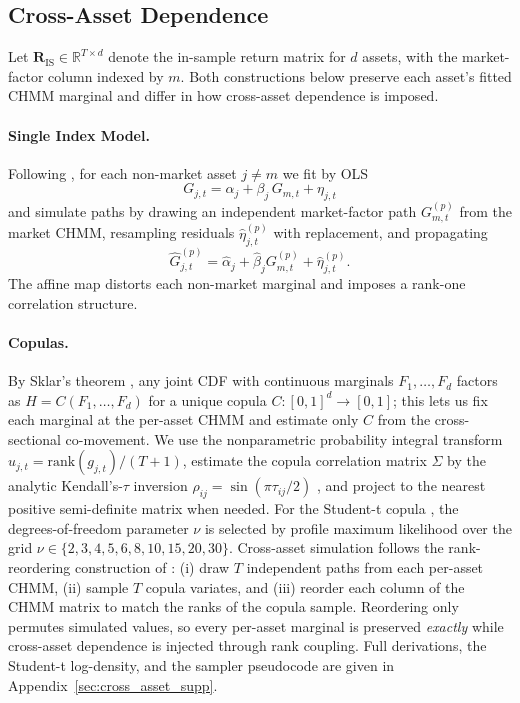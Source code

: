 \subsection{Cross-Asset Dependence}
\label{sec:cross_asset_methods}

Let $\mathbf{R}_{\text{IS}} \in \mathbb{R}^{T \times d}$ denote the in-sample return matrix for $d$ assets, with the market-factor column indexed by $m$.
Both constructions below preserve each asset's fitted CHMM marginal and differ in how cross-asset dependence is imposed.

\paragraph{Single Index Model.}
Following \citet{sharpe1963simplified}, for each non-market asset $j \neq m$ we fit by OLS
\begin{equation}
    G_{j,t} = \alpha_j + \beta_j\, G_{m,t} + \eta_{j,t}
    \label{eq:sim}
\end{equation}
and simulate paths by drawing an independent market-factor path $G_{m,t}^{(p)}$ from the market CHMM, resampling residuals $\hat{\eta}_{j,t}^{(p)}$ with replacement, and propagating
\begin{equation}
    \hat{G}_{j,t}^{(p)} = \hat\alpha_j + \hat\beta_j G_{m,t}^{(p)} + \hat\eta_{j,t}^{(p)}.
    \label{eq:sim_sim}
\end{equation}
The affine map distorts each non-market marginal and imposes a rank-one correlation structure.

\paragraph{Copulas.}
By Sklar's theorem \cite{sklar1959fonctions}, any joint CDF with continuous marginals $F_1, \dots, F_d$ factors as $H = C(F_1, \dots, F_d)$ for a unique copula $C : [0, 1]^d \to [0, 1]$; this lets us fix each marginal at the per-asset CHMM and estimate only $C$ from the cross-sectional co-movement.
We use the nonparametric probability integral transform $u_{j, t} = \text{rank}(g_{j, t}) / (T + 1)$, estimate the copula correlation matrix $\Sigma$ by the analytic Kendall's-$\tau$ inversion $\rho_{ij} = \sin(\pi \tau_{ij} / 2)$ \cite{embrechts2002correlation, mcneil2015quantitative}, and project to the nearest positive semi-definite matrix when needed.
For the Student-t copula \cite{demarta2005tcopula}, the degrees-of-freedom parameter $\nu$ is selected by profile maximum likelihood over the grid $\nu \in \{2, 3, 4, 5, 6, 8, 10, 15, 20, 30\}$.
Cross-asset simulation follows the rank-reordering construction of \citet{iman1982distribution}: (i) draw $T$ independent paths from each per-asset CHMM, (ii) sample $T$ copula variates, and (iii) reorder each column of the CHMM matrix to match the ranks of the copula sample.
Reordering only permutes simulated values, so every per-asset marginal is preserved \emph{exactly} while cross-asset dependence is injected through rank coupling.
Full derivations, the Student-t log-density, and the sampler pseudocode are given in Appendix~\ref{sec:cross_asset_supp}.

